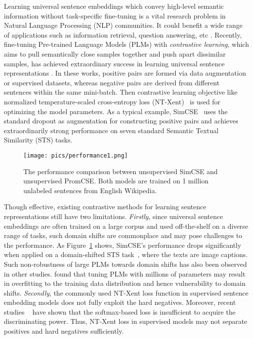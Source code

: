 \documentclass[11pt]{article}
\begin{document}
Learning universal sentence embeddings \cite{KirosZSZUTF15_skipthought, HillCK16, ConneauKSBB17USE, CerYKHLJCGYTSK18, ReimersG19sbert} which convey high-level semantic information without task-specific fine-tuning is a vital research problem in Natural Language Processing (NLP) communities.
It could benefit a wide range of applications such as information retrieval, question answering, etc \cite{LogeswaranL18}. 
Recently, fine-tuning Pre-trained Language Models (PLMs) \cite{devlin2019bert} with \textit{contrastive learning}, which aims to pull semantically close samples together and push apart dissimilar samples, has achieved extraordinary success in learning universal sentence representations \cite{liu2021mirrorbert, declutr, kim2021sgopt, gao2021simcse, chuang2022diffcse}.
In these works, positive pairs are formed via data augmentation or supervised datasets, whereas negative pairs are derived from different sentences within the same mini-batch. Then contrastive learning objective like normalized temperature-scaled cross-entropy loss (NT-Xent)~\cite{Chen2020simclr, gao2021simcse} is used for optimizing the model parameters. 
As a typical example, SimCSE~\cite{gao2021simcse} uses the standard dropout as augmentation for constructing positive pairs and achieves extraordinarily strong performance on seven standard Semantic Textual Similarity (STS) tasks.




\begin{figure}[!t]
	\centering 
	\texttt{[image: pics/performance1.png]}
	\caption{The performance comparison between unsupervised SimCSE and unsupervised PromCSE. Both models are trained on 1 million unlabeled sentences from English Wikipedia.}
	\label{fig: comparison}
\end{figure}

Though effective, existing contrastive methods for learning sentence representations still have two limitations.
\textit{Firstly}, since universal sentence embeddings are often trained on a large corpus and used off-the-shelf on a diverse range of tasks, such domain shifts are commonplace and may pose challenges to the performance. As Figure~\ref{fig: comparison} shows, SimCSE's performance drops significantly when applied on a domain-shifted STS task~\cite{parekh-etal-2021-cococxc}, where the texts are image captions.
Such non-robustness of large PLMs towards domain shifts has also been observed in other studies. \citet{ma2019domain,Lester21sacle} found that tuning PLMs with millions of parameters may result in overfitting to the training data distribution and hence vulnerability to domain shifts. 
\textit{Secondly}, the commonly used NT-Xent loss function in supervised sentence embedding models does not fully exploit the hard negatives.
Moreover, recent studies ~\cite{DBLP:conf/cvpr/WangWZJGZL018,DBLP:conf/cvpr/DengGXZ19} have shown that the softmax-based loss is insufficient to acquire the discriminating power.
Thus, NT-Xent loss in supervised models may not separate positives and hard negatives sufficiently.
\end{document}
